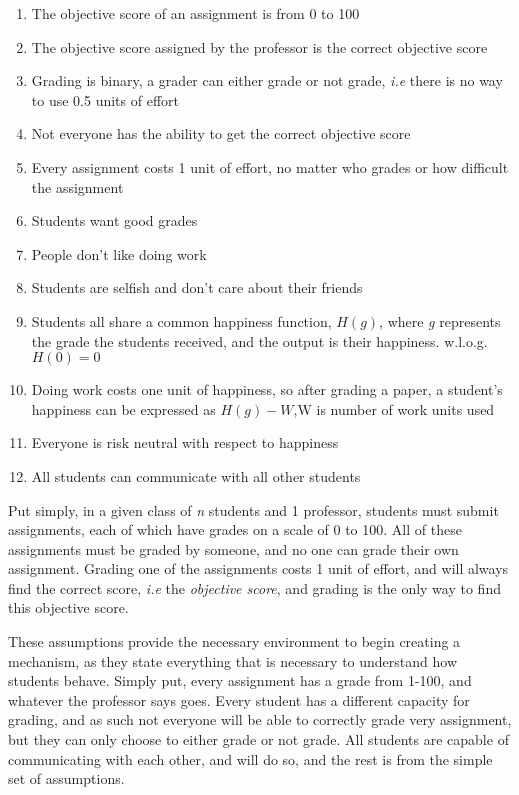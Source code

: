 \documentclass[12pt, Arial]{article}
\begin{document}
\begin{enumerate}
\item The objective score of an assignment is from 0 to 100%
\item The objective score assigned by the professor is the correct objective score%
\item Grading is binary, a grader can either grade or not grade, \emph{i.e} there is no way to use 0.5 units of effort

\item Not everyone has the ability to get the correct objective score 

\item Every assignment costs 1 unit of effort, no matter who grades or how difficult the assignment
\item Students want good grades
\item People don't like doing work
\item Students are selfish and don't care about their friends
\item Students all share a common happiness function, $H(g)$, where \emph{g} represents the grade the students received, and the output is their happiness. w.l.o.g. $H(0)=0$
\item Doing work costs one unit of happiness, so after grading a paper, a student's happiness can be expressed as $H(g)-W$,W is number of work units used
\item Everyone is risk neutral with respect to happiness

\item All students can communicate with all other students

\end{enumerate}

Put simply, in a given class of \emph{n} students and 1 professor, students must submit assignments, each of which have grades on a scale of 0 to 100. All of these assignments must be graded by someone, and no one can grade their own assignment. Grading one of the assignments costs 1 unit of effort, and will always find the correct score, \emph{i.e} the \emph{objective score}, and grading is the only way to find this objective score.

These assumptions provide the necessary environment to begin creating a mechanism, as they state everything that is necessary to understand how students behave. Simply put, every assignment has a grade from 1-100, and whatever the professor says goes. Every student has a different capacity for grading, and as such not everyone will be able to correctly grade very assignment, but they can only choose to either grade or not grade. All students are capable of communicating with each other, and will do so, and the rest is from the simple set of assumptions.
\end{document}
